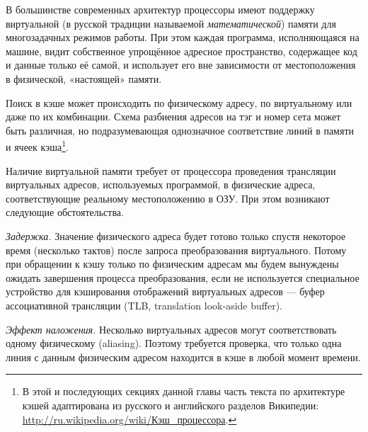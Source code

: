 В большинстве современных архитектур процессоры имеют поддержку виртуальной (в русской традиции называемой \textit{математической}) памяти для многозадачных режимов работы. При этом каждая программа, исполняющаяся на машине, видит собственное упрощённое адресное пространство, содержащее код и данные только её самой, и использует его вне зависимости от местоположения в физической, «настоящей» памяти. 

Поиск в кэше может происходить по физическому адресу, по виртуальному или даже по их комбинации. Схема разбиения адресов на тэг и номер сета может быть различная, но подразумевающая однозначное соответствие линий в памяти и ячеек кэша\footnote{В этой и последующих секциях данной главы часть текста по архитектуре кэшей адаптирована из русского и английского разделов Википедии: \url{http://ru.wikipedia.org/wiki/Кэш_процессора}.}.

Наличие виртуальной памяти требует от процессора проведения трансляции виртуальных  адресов, используемых программой, в физические адреса, соответствующие реальному местоположению в ОЗУ. При этом возникают следующие обстоятельства.

\begin{itemize*}
\item    \textit{Задержка.} Значение физического адреса будет готово только спустя некоторое время (несколько тактов) после запроса преобразования виртуального. Потому при обращении к кэшу только по физическим адресам мы будем вынуждены ожидать завершения процесса преобразования, если не используется специальное устройство для кэширования отображений виртуальных адресов --- буфер ассоциативной трансляции (\abbr TLB, translation look-aside buffer).

\item    \textit{Эффект наложения.} Несколько виртуальных адресов могут соответствовать одному физическому (\abbr aliasing). Поэтому требуется проверка, что только одна линия с данным физическим адресом находится в кэше в любой момент времени.
\end{itemize*}

